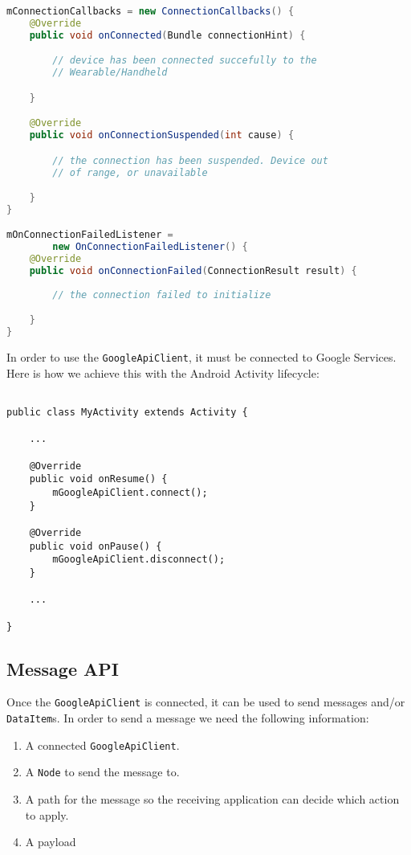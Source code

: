\begin{lstlisting}[language=Java]
mConnectionCallbacks = new ConnectionCallbacks() {
    @Override
    public void onConnected(Bundle connectionHint) {

        // device has been connected succefully to the
        // Wearable/Handheld

    }

    @Override
    public void onConnectionSuspended(int cause) {

        // the connection has been suspended. Device out
        // of range, or unavailable

    }
}

mOnConnectionFailedListener =
        new OnConnectionFailedListener() {
    @Override
    public void onConnectionFailed(ConnectionResult result) {
        
        // the connection failed to initialize

    }
}

\end{lstlisting}

In order to use the \texttt{GoogleApiClient}, it must be connected to Google
Services. Here is how we achieve this with the Android Activity lifecycle:

\begin{lstlisting}

public class MyActivity extends Activity {

    ...

    @Override
    public void onResume() {
        mGoogleApiClient.connect();
    }

    @Override
    public void onPause() {
        mGoogleApiClient.disconnect();
    }

    ...

}

\end{lstlisting}


\subsection{Message API}

Once the \texttt{GoogleApiClient} is connected, it can be used to send messages
and/or \texttt{DataItem}s. In order to send a message we need the following
information:

\begin{enumerate}
\item A connected \texttt{GoogleApiClient}.
\item A \texttt{Node} to send the message to.
\item A path for the message so the receiving application can decide which
    action to apply.
\item A payload
\end{enumerate}

